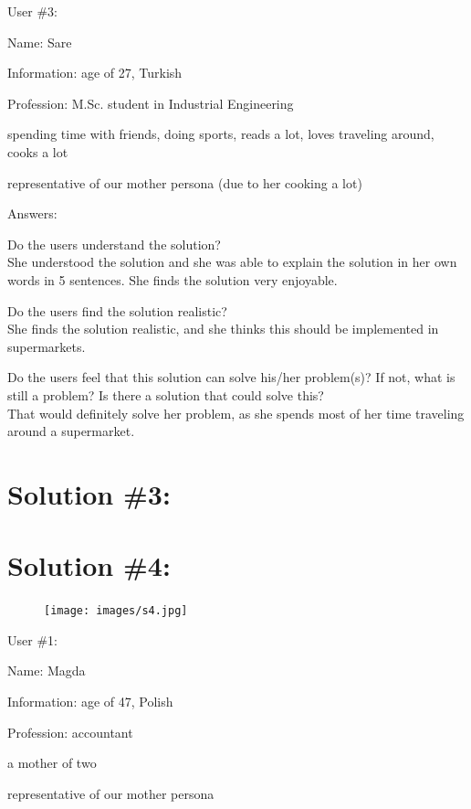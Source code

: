 \documentclass[a4paper,10pt,oneside]{scrreprt}
\begin{document}
User \#3:
\begin{compactitem}
	\item Name: Sare
	\item Information: age of 27, Turkish
	\item Profession: M.Sc. student in Industrial Engineering
	\item spending time with friends, doing sports, reads a lot, loves traveling around, cooks a lot  
	\item representative of our mother persona (due to her cooking a lot)
\end{compactitem}
\bigskip

Answers:
\begin{compactitem}
	\item Do the users understand the solution?\\
	She understood the solution and she was able to explain the solution in her own words in 5 sentences. She finds the solution very enjoyable.\\
	
	
	\item Do the users find the solution realistic?\\
	She finds the solution realistic, and she thinks this should be implemented in supermarkets.\\
	
	\item Do the users feel that this solution can solve his/her problem(s)? If not, what is still
	a problem? Is there a solution that could solve this?\\
	That would definitely solve her problem, as she spends most of her time traveling around a supermarket.\\
\end{compactitem}
\bigskip



\clearpage
\section{Solution \#3:}

\clearpage
\section{Solution \#4:}
\begin{figure}[h]
	\centering
	\texttt{[image: images/s4.jpg]}
\end{figure}
User \#1:
\begin{compactitem}
	\item Name: Magda
	\item Information: age of 47, Polish
	\item Profession: accountant 
	\item a mother of two
	\item representative of our mother persona 
\end{compactitem}
\bigskip
\end{document}
